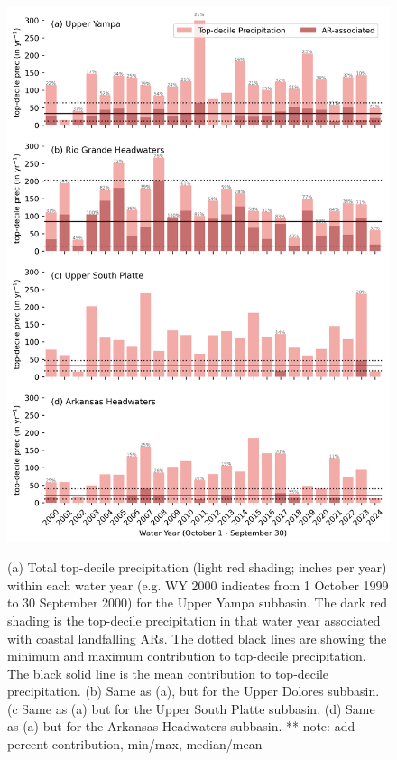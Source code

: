 \documentclass[draft]{agujournal2019}
\begin{document}
\begin{figure}
\includegraphics{fig4.png}
\label{fig:time_series}
\caption{(a) Total top-decile precipitation (light red shading; inches per year) within each water year (e.g. WY 2000 indicates from 1 October 1999 to 30 September 2000) for the Upper Yampa subbasin. The dark red shading is the top-decile precipitation in that water year associated with coastal landfalling ARs. The dotted black lines are showing the minimum and maximum contribution to top-decile precipitation. The black solid line is the mean contribution to top-decile precipitation. (b) Same as (a), but for the Upper Dolores subbasin. (c Same as (a) but for the Upper South Platte subbasin. (d) Same as (a) but for the Arkansas Headwaters subbasin. ** note: add percent contribution, min/max, median/mean}
\end{figure}
\end{document}
